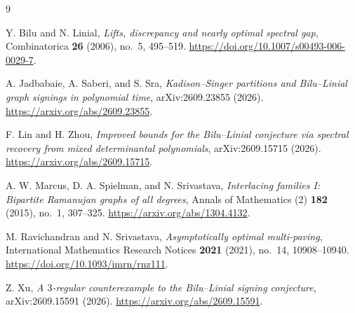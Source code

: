 \documentclass[11pt]{article}
\numberwithin{equation}{section}
\theoremstyle{remark}
\begin{document}
\begin{thebibliography}{9}

Y. Bilu and N. Linial,
\emph{Lifts, discrepancy and nearly optimal spectral gap},
Combinatorica \textbf{26} (2006), no.~5, 495--519.
\url{https://doi.org/10.1007/s00493-006-0029-7}.

A. Jadbabaie, A. Saberi, and S. Sra,
\emph{Kadison--Singer partitions and Bilu--Linial graph signings
in polynomial time},
arXiv:2609.23855 (2026).
\url{https://arxiv.org/abs/2609.23855}.

F. Lin and H. Zhou,
\emph{Improved bounds for the Bilu--Linial conjecture via spectral
recovery from mixed determinantal polynomials},
arXiv:2609.15715 (2026).
\url{https://arxiv.org/abs/2609.15715}.

A. W. Marcus, D. A. Spielman, and N. Srivastava,
\emph{Interlacing families I: Bipartite Ramanujan graphs of all degrees},
Annals of Mathematics (2) \textbf{182} (2015), no.~1, 307--325.
\url{https://arxiv.org/abs/1304.4132}.

M. Ravichandran and N. Srivastava,
\emph{Asymptotically optimal multi-paving},
International Mathematics Research Notices \textbf{2021} (2021),
no.~14, 10908--10940.
\url{https://doi.org/10.1093/imrn/rnz111}.

Z. Xu,
\emph{A $3$-regular counterexample to the Bilu--Linial signing
conjecture},
arXiv:2609.15591 (2026).
\url{https://arxiv.org/abs/2609.15591}.

\end{thebibliography}
\end{document}

